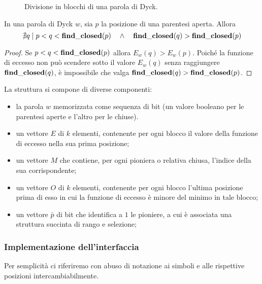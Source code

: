 \begin{figure}[ht]
	\centering
	
	\caption{Divisione in blocchi di una parola di Dyck.}
	\label{fig:paren_blocks}
\end{figure}

\begin{lemma}\label{lem:dyckincro}
	In una parola di Dyck $w$, sia $p$ la posizione di una parentesi aperta. Allora
	\begin{equation*}
		\nexists q\mid p<q<\mathbf{find\_closed}(p) \quad\land\quad \mathbf{find\_closed}(q)>\mathbf{find\_closed}(p)
	\end{equation*}
\end{lemma}
\begin{proof}
	Se $p<q<\mathbf{find\_closed}(p)$ allora $E_w(q)>E_w(p)$. Poiché la funzione di eccesso non può scendere sotto il valore $E_w(q)$ senza raggiungere $\mathbf{find\_closed}(q)$, è impossibile che valga $\mathbf{find\_closed}(q)>\mathbf{find\_closed}(p)$.
\end{proof}

\noindent La struttura si compone di diverse componenti:
\begin{itemize}
	\item la parola $w$ memorizzata come sequenza di bit (un valore booleano per le parentesi aperte e l'altro per le chiuse).
	\item un vettore $E$ di $k$ elementi, contenente per ogni blocco il valore della funzione di eccesso nella sua prima posizione;
	\item un vettore $M$ che contiene, per ogni pioniera o relativa chiusa, l'indice della sua corrispondente;
	\item un vettore $O$ di $k$ elementi, contenente per ogni blocco l'ultima posizione prima di esso in cui la funzione di eccesso è minore del minimo in tale blocco;
	\item un vettore $\bar p$ di bit che identifica a $1$ le pioniere, a cui è associata una struttura succinta di rango e selezione;
\end{itemize}

\subsubsection{Implementazione dell'interfaccia}
\newcommand{\dyfindopenb}{\mathbf{find\_open}}
\newcommand{\dyfindclosedb}{\mathbf{find\_closed}}
\newcommand{\dyencloseb}{\mathbf{enclose}}
Per semplicità ci riferiremo con abuso di notazione ai simboli e alle rispettive posizioni intercambiabilmente.

